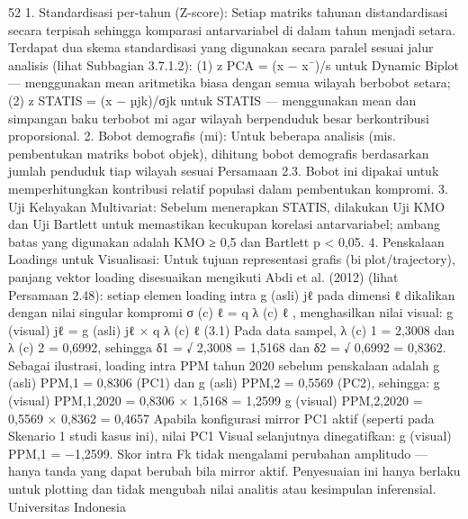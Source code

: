 52
1. Standardisasi per-tahun (Z-score): Setiap matriks tahunan distandardisasi secara
terpisah sehingga komparasi antarvariabel di dalam tahun menjadi setara. Terdapat
dua skema standardisasi yang digunakan secara paralel sesuai jalur analisis (lihat
Subbagian 3.7.1.2): (1) z
PCA = (x − x¯)/s untuk Dynamic Biplot — menggunakan
mean aritmetika biasa dengan semua wilayah berbobot setara; (2) z
STATIS = (x −
µjk)/σjk untuk STATIS — menggunakan mean dan simpangan baku terbobot mi
agar wilayah berpenduduk besar berkontribusi proporsional.
2. Bobot demografis (mi): Untuk beberapa analisis (mis. pembentukan matriks bobot
objek), dihitung bobot demografis berdasarkan jumlah penduduk tiap wilayah sesuai
Persamaan 2.3. Bobot ini dipakai untuk memperhitungkan kontribusi relatif populasi
dalam pembentukan kompromi.
3. Uji Kelayakan Multivariat: Sebelum menerapkan STATIS, dilakukan Uji KMO
dan Uji Bartlett untuk memastikan kecukupan korelasi antarvariabel; ambang batas
yang digunakan adalah KMO ≥ 0,5 dan Bartlett p < 0,05.
4. Penskalaan Loadings untuk Visualisasi: Untuk tujuan representasi grafis (biplot/trajectory), panjang vektor loading disesuaikan mengikuti Abdi et al. (2012)
(lihat Persamaan 2.48): setiap elemen loading intra g
(asli)
jℓ pada dimensi ℓ dikalikan
dengan nilai singular kompromi σ
(c)
ℓ =
q
λ
(c)
ℓ
, menghasilkan nilai visual:
g
(visual)
jℓ = g
(asli)
jℓ ×
q
λ
(c)
ℓ
(3.1)
Pada data sampel, λ
(c)
1 = 2,3008 dan λ
(c)
2 = 0,6992, sehingga δ1 =
√
2,3008 =
1,5168 dan δ2 =
√
0,6992 = 0,8362. Sebagai ilustrasi, loading intra PPM tahun
2020 sebelum penskalaan adalah g
(asli)
PPM,1 = 0,8306 (PC1) dan g
(asli)
PPM,2 = 0,5569 (PC2),
sehingga:
g
(visual)
PPM,1,2020 = 0,8306 × 1,5168 = 1,2599
g
(visual)
PPM,2,2020 = 0,5569 × 0,8362 = 0,4657
Apabila konfigurasi mirror PC1 aktif (seperti pada Skenario 1 studi kasus ini),
nilai PC1 Visual selanjutnya dinegatifkan: g
(visual)
PPM,1 = −1,2599. Skor intra Fk tidak
mengalami perubahan amplitudo — hanya tanda yang dapat berubah bila mirror
aktif. Penyesuaian ini hanya berlaku untuk plotting dan tidak mengubah nilai analitis
atau kesimpulan inferensial.
Universitas Indonesia

